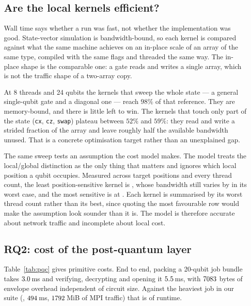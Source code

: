 \documentclass[11pt]{article}
\begin{document}
\subsection{Are the local kernels efficient?}
\label{sec:kernels}

Wall time says whether a run was fast, not whether the implementation was
good. State-vector simulation is bandwidth-bound, so each kernel is compared
against what the same machine achieves on an in-place scale of an array of the
same type, compiled with the same flags and threaded the same way. The
in-place shape is the comparable one: a gate reads and writes a single array,
which is not the traffic shape of a two-array copy.

At 8 threads and 24 qubits the kernels that sweep the whole state --- a
general single-qubit gate and a diagonal one --- reach $98\%$ of that
reference. They are memory-bound, and there is little left to win. The kernels
that touch only part of the state (\texttt{cx}, \texttt{cz}, \texttt{swap})
plateau between $52\%$ and $59\%$: they read and write a strided fraction of
the array and leave roughly half the available bandwidth unused. That is a
concrete optimisation target rather than an unexplained gap.

The same sweep tests an assumption the cost model makes. The model treats the
local/global distinction as the only thing that matters and ignores which
local position a qubit occupies. Measured across target positions and
every thread count, the least position-sensitive kernel is
\aegisqBestPositionKernel, whose bandwidth still varies by
\aegisqBestPositionSpread{} in its worst case, and the most sensitive is
\aegisqWorstPositionKernel{} at \aegisqWorstPositionSpread. Each kernel is
summarised by its worst thread count rather than its best, since quoting the
most favourable row would make the assumption look sounder than it is. The model is therefore accurate about network traffic and
incomplete about local cost.

\subsection{RQ2: cost of the post-quantum layer}



Table~\ref{tab:pqc} gives primitive costs. End to end, packing a 20-qubit job
bundle takes $3.0$\,ms and verifying, decrypting and opening it
$5.5$\,ms, with $7083$ bytes of envelope overhead
independent of circuit size. Against the heaviest job in our suite
(\aegisqHeaviestCircuit, $494$\,ms,
$1792$\,MiB of MPI traffic) that is \aegisqEnvelopeOverhead{}
of runtime.
\end{document}
